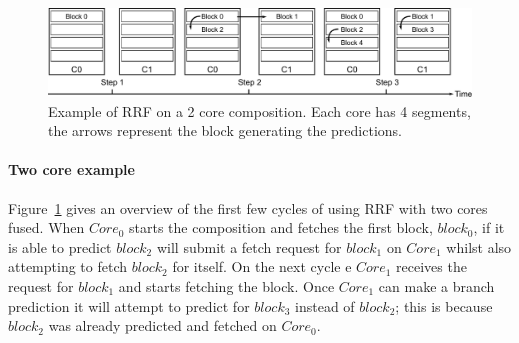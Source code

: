 \begin{figure}[t]
    \centering
    \includegraphics[width=1\textwidth]{chapter3/graphics/fetching-model.pdf}
\vspace{-2em}
    \caption{Example of RRF on a 2 core composition. Each core has 4 segments, the arrows represent the block generating the predictions.}
    \label{fig:new_fetch_ex}
	\vspace{1em}
\end{figure}
	
\paragraph*{Two core example}
	
Figure~\ref{fig:new_fetch_ex} gives an overview of the first few cycles of using RRF with two cores fused.
When $Core_0$ starts the composition and fetches the first block, $block_0$, if it is able to predict $block_2$ will submit a fetch request for $block_1$ on $Core_1$ whilst also attempting to fetch $block_2$ for itself.
On the next cycle	e $Core_1$ receives the request for $block_1$ and starts fetching the block.
Once $Core_1$ can make a branch prediction it will attempt to predict for $block_3$ instead of $block_2$; this is because $block_2$ was already predicted and fetched on $Core_0$.



